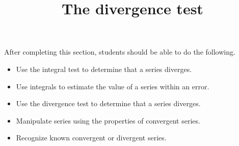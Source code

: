 \documentclass{ximera}
\title{The divergence test}
\begin{document}
\begin{abstract}
\end{abstract}

\maketitle

\begin{sectionOutcomes}

After completing this section, students should be able to do the following.

\begin{itemize}
\item Use the integral test to  determine that a series diverges.
\item Use integrals to estimate the value of a series within an error.
\item Use the divergence test to determine that a series diverges.
\item Manipulate series using the properties of convergent series.
\item Recognize known convergent or divergent series.
\end{itemize}

\end{sectionOutcomes}
\end{document}
